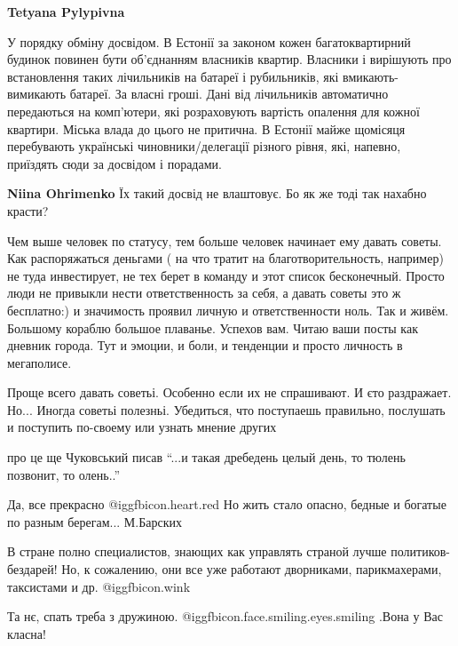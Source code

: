 \begin{itemize}
\begin{itemize}
\textbf{Tetyana Pylypivna} 

У порядку обміну досвідом. В Естонії за законом кожен багатоквартирний будинок
повинен бути об'єднанням власників квартир. Власники і вирішують про
встановлення таких лічильників на батареї і рубильників, які вмикають-вимикають
батареї. За власні гроші. Дані від лічильників автоматично передаються на
комп'ютери, які розраховують вартість опалення для кожної квартири. Міська
влада до цього не притична. В Естонії майже щомісяця перебувають українські
чиновники/делегації різного рівня, які, напевно, приїздять сюди за досвідом і
порадами.

\textbf{Niina Ohrimenko} Їх такий досвід не влаштовує. Бо як же тоді так нахабно красти?

\end{itemize} %


Чем выше человек по статусу, тем больше человек начинает ему давать советы. Как
распоряжаться деньгами ( на что тратит на благотворительность, например) не
туда инвестирует, не тех берет в команду и этот список бесконечный. Просто люди
не привыкли нести ответственность за себя, а давать советы это ж бесплатно:) и
значимость проявил личную и ответственности ноль. Так и живём. Большому кораблю
большое плаванье. Успехов вам. Читаю ваши посты как дневник города. Тут и
эмоции, и боли, и тенденции и просто личность в мегаполисе.


Проще всего давать советьі. Особенно если их не спрашивают. И єто раздражает.
Но... Иногда советьі полезньі. Убедиться, что поступаешь правильно, послушать и
поступить по-своему или узнать мнение других

про це ще Чуковський писав \enquote{...и такая дребедень целый день, то тюлень позвонит, то олень..}

Да, все прекрасно @igg{fbicon.heart.red} Но жить стало опасно, бедные и богатые по разным берегам... М.Барских


В стране полно специалистов, знающих как управлять страной лучше
политиков-бездарей! Но, к сожалению, они все уже работают дворниками,
парикмахерами, таксистами и др.  @igg{fbicon.wink} 

Та нє, спать треба з дружиною. @igg{fbicon.face.smiling.eyes.smiling} .Вона у Вас класна!


\end{itemize}
